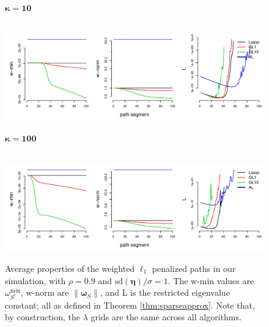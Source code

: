 \documentclass[12pt]{article}
\newcommand{\bs}[1]{\boldsymbol{#1}}
\newcommand{\mr}[1]{\mathrm{#1}}
\begin{document}
\begin{figure}[p]
$\boldsymbol{{\kappa} = 10}$

~~~~~~\includegraphics[width=.9\textwidth]{graphs/weights-r09-s1-d10}



$\boldsymbol{{\kappa} = 100}$

~~~~~~\includegraphics[width=.9\textwidth]{graphs/weights-r09-s1-d100}


\caption{\label{fig:weights} Average properties of the weighted $\ell_1$ penalized paths in our simulation, with $\rho=0.9$ and $\mathrm{sd}(\bs{\eta})/\sigma=1$.
The {\sf\footnotesize w-min} values are $\omega^{\mr{min}}_{S^c}$, {\sf\footnotesize w-norm} are $\|\bs{\omega}_S\|$, and {\sf\footnotesize L} is the restricted eigenvalue constant; all as defined in Theorem \ref{thm:sparseapprox}.  Note that, by construction, the $\lambda$ grids are the same across all algorithms.} 
\end{figure}
\end{document}
